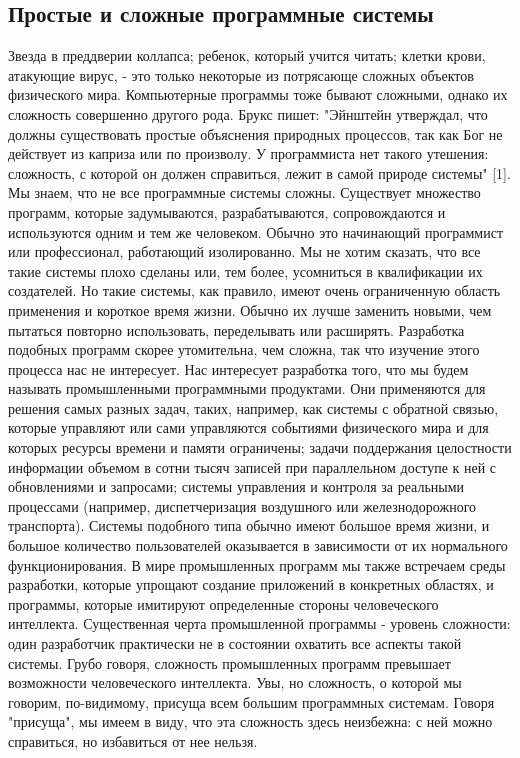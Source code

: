 \documentclass[11pt]{article}
\begin{document}
\subsection{Простые и сложные программные системы}
Звезда в преддверии коллапса; ребенок, который учится читать; клетки крови, атакующие вирус, - это только некоторые из потрясающе сложных объектов физического мира. Компьютерные программы тоже бывают сложными, однако их сложность совершенно другого рода. Брукс пишет: "Эйнштейн утверждал, что должны существовать простые объяснения природных процессов, так как Бог не действует из каприза или по произволу. У программиста нет такого утешения: сложность, с которой он должен справиться, лежит в самой природе системы" [1]. 
Мы знаем, что не все программные системы сложны. Существует множество программ, которые задумываются, разрабатываются, сопровождаются и используются одним и тем же человеком. Обычно это начинающий программист или профессионал, работающий изолированно. Мы не хотим сказать, что все такие системы плохо сделаны или, тем более, усомниться в квалификации их создателей. Но такие системы, как правило, имеют очень ограниченную область применения и короткое время жизни. Обычно их лучше заменить новыми, чем пытаться повторно использовать, переделывать или расширять. Разработка подобных программ скорее утомительна, чем сложна, так что изучение этого процесса нас не интересует. 
Нас интересует разработка того, что мы будем называть промышленными программными продуктами. Они применяются для решения самых разных задач, таких, например, как системы с обратной связью, которые управляют или сами управляются событиями физического мира и для которых ресурсы времени и памяти ограничены; задачи поддержания целостности информации объемом в сотни тысяч записей при параллельном доступе к ней с обновлениями и запросами; системы управления и контроля за реальными процессами (например, диспетчеризация воздушного или железнодорожного транспорта). Системы подобного типа обычно имеют большое время жизни, и большое количество пользователей оказывается в зависимости от их нормального функционирования. В мире промышленных программ мы также встречаем среды разработки, которые упрощают создание приложений в конкретных областях, и программы, которые имитируют определенные стороны человеческого интеллекта. 
Существенная черта промышленной программы - уровень сложности: один разработчик практически не в состоянии охватить все аспекты такой системы. Грубо говоря, сложность промышленных программ превышает возможности человеческого интеллекта. Увы, но сложность, о которой мы говорим, по-видимому, присуща всем большим программных системам. Говоря "присуща", мы имеем в виду, что эта сложность здесь неизбежна: с ней можно справиться, но избавиться от нее нельзя. 
\end{document}
